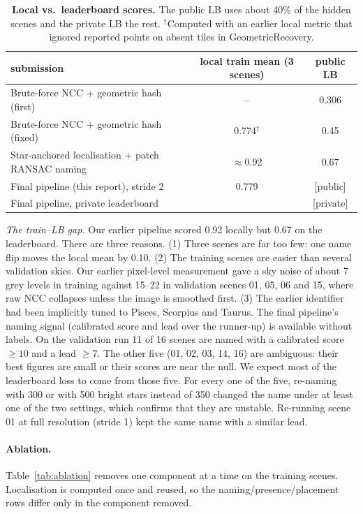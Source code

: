 \documentclass[a4paper,11pt]{article}
\newcommand{\fillin}[1]{{\color{red}[#1]}}
\begin{document}
\begin{table}[h]
\centering\small
\begin{tabular}{lcc}
\toprule
submission & local train mean (3 scenes) & public LB \\
\midrule
Brute-force NCC + geometric hash (first) & -- & 0.306 \\
Brute-force NCC + geometric hash (fixed) & 0.774$^\dagger$ & 0.45 \\
Star-anchored localisation + patch RANSAC naming & $\approx$0.92 & 0.67 \\
Final pipeline (this report), stride 2 & 0.779 & \fillin{public} \\
\midrule
Final pipeline, private leaderboard & & \fillin{private} \\
\bottomrule
\end{tabular}
\caption{\textbf{Local vs.\ leaderboard scores.} The public LB uses about 40\% of the hidden scenes and the private LB the
rest. $^\dagger$Computed with an earlier local metric that ignored reported points on absent tiles in GeometricRecovery.}
\label{tab:lb}
\end{table}

\emph{The train--LB gap.} Our earlier pipeline scored 0.92 locally but 0.67 on the leaderboard. There are three
reasons. (1) Three scenes are far too few: one name flip moves the local mean by 0.10. (2) The training scenes are
easier than several validation skies. Our earlier pixel-level measurement gave a sky noise of about 7 grey levels in
training against 15--22 in validation scenes 01, 05, 06 and 15, where raw NCC collapses unless the image is smoothed
first. (3) The earlier identifier had been implicitly tuned to Pisces, Scorpius and Taurus. The final
pipeline's naming signal (calibrated score and lead over the runner-up) is available without labels. On the validation
run 11 of 16 scenes are named with a calibrated score $\ge10$ and a lead $\ge7$. The other five (01, 02, 03, 14, 16) are
ambiguous: their best figures are small or their scores are near the null. We expect most of the leaderboard loss to come
from those five. For every one of the five, re-naming with 300 or with 500 bright stars instead of 350 changed the name under at
least one of the two settings, which confirms that they are unstable. Re-running scene 01 at full resolution (stride 1)
kept the same name with a similar lead.

\paragraph{Ablation.} Table~\ref{tab:ablation} removes one component at a time on the training scenes. Localisation is
computed once and reused, so the naming/presence/placement rows differ only in the component removed.
\end{document}
